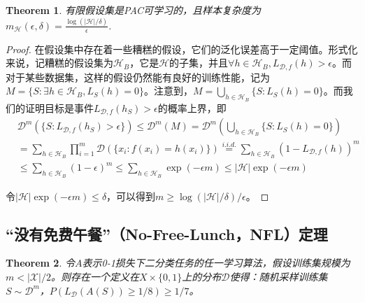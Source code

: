 \documentclass{article}
\newtheorem{theorem}{Theorem}
\newtheorem*{proof}{Proof}
\begin{document}
	\begin{theorem} 有限假设集是PAC可学习的，且样本复杂度为$m_\mathcal{H}(\epsilon,\delta)=\frac{\log(|\mathcal{H}|/\delta)}{\epsilon}$.
	\end{theorem}
	
	\begin{proof} 在假设集中存在着一些糟糕的假设，它们的泛化误差高于一定阈值。形式化来说，记糟糕的假设集为$\mathcal{H}_B$，它是$\mathcal{H}$的子集，并且$\forall h\in\mathcal{H}_B,L_{\mathcal{D},f}(h)>\epsilon$。而对于某些数据集，这样的假设仍然能有良好的训练性能，记为$M=\{S:\exists h\in \mathcal{H}_B, L_S(h)=0\}$。注意到，$M=\bigcup\limits_{h\in\mathcal{H}_B}\{S:L_S(h)=0\}$。而我们的证明目标是事件$L_{\mathcal{D},f}(h_S)>\epsilon$的概率上界，即
	\begin{equation*}
	\begin{split}
	&\mathcal{D}^m(\{S:L_{\mathcal{D},f}(h_S)>\epsilon\})\leq\mathcal{D}^m(M) 
	=\mathcal{D}^m(\bigcup\limits_{h\in\mathcal{H}_B}\{S:L_S(h)=0\})        \\ 
	&=\sum_{h\in\mathcal{H}_B}\prod_{i=1}^m\mathcal{D}(\{x_i:f(x_i)=h(x_i)\})
	\overset{i.i.d.}{=}\sum_{h\in\mathcal{H}_B}(1-L_{\mathcal{D},f}(h))^m      \\
	&\leq\sum_{h\in\mathcal{H}_B}(1-\epsilon)^m\leq\sum_{h\in\mathcal{H}_B}\exp(-\epsilon m)
	\leq|\mathcal{H}|\exp(-\epsilon m)
	\end{split}
	\end{equation*}

	令$|\mathcal{H}|\exp(-\epsilon m)\leq\delta$，可以得到$m\geq\log(|\mathcal{H}|/\delta)/\epsilon$。
	\end{proof}

\subsection{“没有免费午餐”（No-Free-Lunch，NFL）定理}

	\begin{theorem}
	令$A$表示0-1损失下二分类任务的任一学习算法，假设训练集规模为$m<|\mathcal{X}|/2$。则存在一个定义在${X}\times\{0,1\}$上的分布$\mathcal{D}$使得：随机采样训练集$S\sim\mathcal{D}^m$，$P(L_\mathcal{D}(A(S))\geq 1/8)\geq 1/7$。
	\end{theorem}
	
\end{document}
